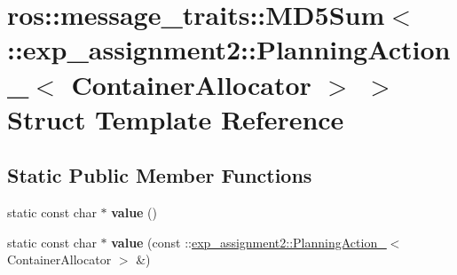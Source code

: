 \hypertarget{structros_1_1message__traits_1_1MD5Sum_3_01_1_1exp__assignment2_1_1PlanningAction___3_01ContainerAllocator_01_4_01_4}{}\section{ros\+:\+:message\+\_\+traits\+:\+:M\+D5\+Sum$<$ \+:\+:exp\+\_\+assignment2\+:\+:Planning\+Action\+\_\+$<$ Container\+Allocator $>$ $>$ Struct Template Reference}
\label{structros_1_1message__traits_1_1MD5Sum_3_01_1_1exp__assignment2_1_1PlanningAction___3_01ContainerAllocator_01_4_01_4}
\subsection*{Static Public Member Functions}
\begin{DoxyCompactItemize}
\item 
\mbox{\label{structros_1_1message__traits_1_1MD5Sum_3_01_1_1exp__assignment2_1_1PlanningAction___3_01ContainerAllocator_01_4_01_4_a07718892ac61749ac264d04b2b0d69f0}} 
static const char $\ast$ {\bfseries value} ()
\item 
\mbox{\label{structros_1_1message__traits_1_1MD5Sum_3_01_1_1exp__assignment2_1_1PlanningAction___3_01ContainerAllocator_01_4_01_4_afd02e92c4398ef01cc24e1d8c4cbc7ef}} 
static const char $\ast$ {\bfseries value} (const \+::\hyperlink{structexp__assignment2_1_1PlanningAction__}{exp\+\_\+assignment2\+::\+Planning\+Action\+\_\+}$<$ Container\+Allocator $>$ \&)
\end{DoxyCompactItemize}
